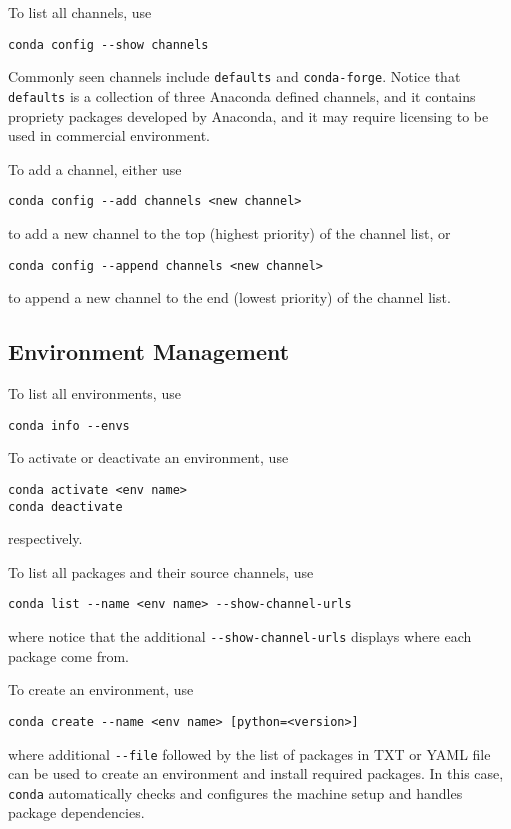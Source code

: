 To list all channels, use
\begin{lstlisting}
conda config --show channels
\end{lstlisting}

Commonly seen channels include \verb|defaults| and \verb|conda-forge|. Notice that \verb|defaults| is a collection of three Anaconda defined channels, and it contains propriety packages developed by Anaconda, and it may require licensing to be used in commercial environment.

To add a channel, either use
\begin{lstlisting}
conda config --add channels <new channel>
\end{lstlisting}
to add a new channel to the top (highest priority) of the channel list, or
\begin{lstlisting}
conda config --append channels <new channel>
\end{lstlisting}
to append a new channel to the end (lowest priority) of the channel list.

\subsection{Environment Management}

To list all environments, use
\begin{lstlisting}
conda info --envs
\end{lstlisting}

To activate or deactivate an environment, use
\begin{lstlisting}
conda activate <env name>
conda deactivate
\end{lstlisting}
respectively.

To list all packages and their source channels, use
\begin{lstlisting}
conda list --name <env name> --show-channel-urls
\end{lstlisting}
where notice that the additional \verb|--show-channel-urls| displays where each package come from.

To create an environment, use
\begin{lstlisting}
conda create --name <env name> [python=<version>]
\end{lstlisting}
where additional \verb|--file| followed by the list of packages in TXT or YAML file can be used to create an environment and install required packages. In this case, \verb|conda| automatically checks and configures the machine setup and handles package dependencies. 

